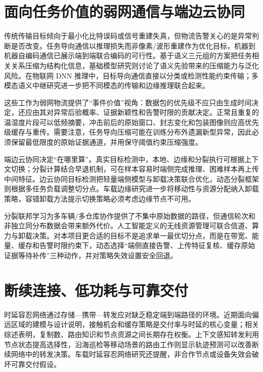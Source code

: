 \documentclass[11pt,a4paper]{article}
\begin{document}
\section{面向任务价值的弱网通信与端边云协同}

传统传输目标倾向于最小化比特误码或信号重建失真，但物流告警关心的是异常判断是否改变。任务导向通信以推理损失而非像素/波形重建作为优化目标，机器到机器自编码通信已展示端到端联合编码的可行性\cite{anautoencoderbased2024}。基于语义三元组的方案把任务相关关系压缩为结构化信息\cite{taskorientedsemantic2023}，基础模型研究则讨论了语义先验带来的压缩能力与泛化风险\cite{taskorientedsemantic2024}。在物联网 DNN 推理中，目标导向通信直接以分类或检测性能约束传输\cite{goalorientedsemantic2024}；多模态语义中继研究进一步把不同模态的传输和边缘推理联合起来\cite{distributedtaskoriented2024}。

这些工作为弱网物流提供了“事件价值”视角：数据包的优先级不应只由生成时间决定，还应由其对异常后验概率、证据新颖性和告警时限的贡献决定。正常且重复的温湿度片段可以低频摘要，冲击前后的原始窗口、封志变化和包装图像则应高优先级缓存与重传。需要注意，任务导向压缩可能在训练分布外遗漏新型异常，因此必须保留最低限度的原始证据通道，并用保守阈值约束压缩强度。

端边云协同决定“在哪里算”。真实目标检测中，本地、边缘和分裂执行可根据上下文切换\cite{furciferacontext2024}；分裂计算结合早退机制，可在样本容易时端侧完成推理、困难样本再上传中间特征\cite{ispliteeimage2024}。边云协同目标检测把轻量端侧模型与卸载决策联合优化\cite{edgecloudcollaborative2024}，动态分裂框架则根据多任务负载调整切分点\cite{dynamicsplitcomputing2025}。车载边缘研究进一步将移动性与资源分配纳入卸载策略\cite{vehicularcomputingpower2025}，容错卸载方法提示切换策略必须考虑边缘节点不可用\cite{faulttolerantmobile2025}。

分裂联邦学习为多车辆/多仓库协作提供了不集中原始数据的路径，但通信轮次和非独立同分布数据会带来额外代价\cite{splitfederatedlearning2024}。人工智能定义的无线资源管理可联合信道、算力与卸载决策\cite{artificialintelligencedefined2024}。对本项目更合适的目标不是追求单一最优切分点，而是在带宽、能量、缓存和告警时限约束下，动态选择“端侧直接告警、上传特征复核、缓存原始证据等待补传”三种动作，并对策略失效设置安全回退。

\section{断续连接、低功耗与可靠交付}

时延容忍网络通过存储—携带—转发应对缺乏稳定端到端路径的环境。近期面向偏远区域的建模与设计说明，接触机会和缓存策略是交付率与时延的核心变量\cite{delaytolerantnetworks2025}；相关综述表明，复制数、路由知识和节点资源之间长期存在权衡\cite{reviewonrecent2022}。上下文感知转发利用节点状态提高选择性\cite{acontextaware2022}，沿海巡检等移动场景的路由工作则显示轨迹预测可以改善断续网络中的转发决策\cite{udtnrsa2023}。车载时延容忍网络研究还提醒，非合作节点或设备失效会破坏可靠交付假设\cite{emsefficientmonitoring2022}。
\end{document}
